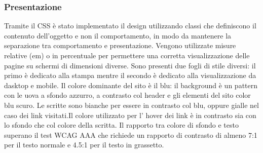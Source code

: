 \subsubsection{Presentazione}
Tramite il CSS è stato implementato il design utilizzando classi che definiscono il contenuto dell'oggetto e non il comportamento, in modo da mantenere la separazione tra comportamento e presentazione. Vengono utilizzate misure relative (em) o in percentuale per permettere una corretta visualizzazione delle pagine su schermi di dimensioni diverse. Sono presenti due fogli di stile diversi: il primo è dedicato alla stampa mentre il secondo è dedicato alla visualizzazione da dasktop e mobile.
Il colore dominante del sito è il blu: il background è un pattern con le uova a sfondo azzurro, a contrasto col header e gli elementi del sito color blu scuro. Le scritte sono bianche per essere in contrasto col blu, oppure gialle nel caso dei link visitati.Il colore utilizzato per l' hover dei link è in contrasto sia con lo sfondo che col colore della scritta. Il rapporto tra colore di sfondo e testo superano il test WCAG AAA che richiede un rapporto di contrasto di almeno 7:1 per il testo normale e 4.5:1 per il testo in grassetto.




